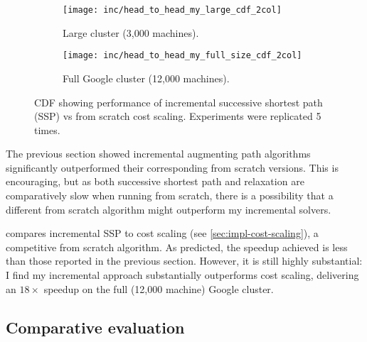 \begin{figure}
    \begin{widepage}
        \begin{subfigure}[c]{0.5\textwidth}
            \texttt{[image: inc/head\_to\_head\_my\_large\_cdf\_2col]}
            \caption{Large cluster (3,000 machines).}
        \end{subfigure}
        \begin{subfigure}[c]{0.5\textwidth}
            \texttt{[image: inc/head\_to\_head\_my\_full\_size\_cdf\_2col]}
            \caption{Full Google cluster (12,000 machines).}
        \end{subfigure}
    \end{widepage}
    \caption[Performance of incremental successive shortest path vs from scratch cost scaling]{CDF showing performance of incremental successive shortest path (SSP) vs from scratch cost scaling. Experiments were replicated 5 times.}
    \label{fig:inc-head-to-head-my}
\end{figure}

The previous section showed incremental augmenting path algorithms significantly outperformed their corresponding from scratch versions. This is encouraging, but as both successive shortest path and relaxation are comparatively slow when running from scratch, there is a possibility that a different from scratch algorithm might outperform my incremental solvers.

 compares incremental SSP to cost scaling (see \cref{sec:impl-cost-scaling}), a competitive from scratch algorithm. As predicted, the speedup achieved is less than those reported in the previous section. However, it is still highly substantial: I find my incremental approach substantially outperforms cost scaling, delivering an $18\times$ speedup on the full (12,000 machine) Google cluster.

\subsection{Comparative evaluation}

